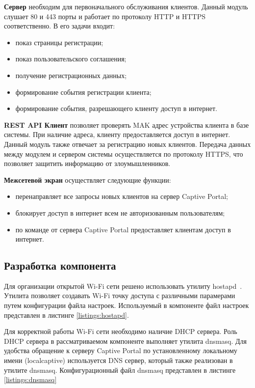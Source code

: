 \textbf{Сервер} необходим для первоначального обслуживания клиентов. Данный модуль слушает 80 и 443 порты и работает по протоколу HTTP и HTTPS соответственно. В его задачи входит:

\begin{itemize}
	\item показ страницы регистрации;
	\item показ пользовательского соглашения;
	\item получение регистрационных данных;
	\item формирование события регистрации клиента;
	\item формирование события, разрешающего клиенту доступ в интернет.
\end{itemize}

\textbf{REST API Клиент} позволяет проверять MAK адрес устройства клиента в базе системы. При наличие адреса, клиенту предоставляется доступ в интернет. Данный модуль также отвечает за регистрацию новых клиентов. Передача данных между модулем и сервером системы осуществляется по протоколу HTTPS, что позволяет защитить информацию от злоумышленников.

\textbf{Межсетевой экран} осуществляет следующие функции:
\begin{itemize}
	\item перенаправляет все запросы новых клиентов на сервер Captive Portal;
	\item блокирует доступ в интернет всем не авторизованным пользователям;
	\item по команде от сервера Captive Portal предоставляет клиентам доступ в интернет.
\end{itemize}

\subsection{Разработка компонента}

Для организации открытой Wi-Fi сети решено использовать утилиту hostapd~\cite{hostapd}. Утилита позволяет создавать Wi-Fi точку доступа с различными парамерами путем конфигурации файла настроек. Используемый в компоненте файл настроек представлен в листинге \ref{listings:hostapd}.

Для корректной работы Wi-Fi сети необходимо наличие DHCP сервера. Роль DHCP сервера в рассматриваемом компоненте выполняет утилита dnsmasq. Для удобства обращение к серверу Captive Portal по установленному локальному имени (localcaptive) используется DNS сервер, который также реализован в утилите dnsmasq. Конфигурационный файл dnsmasq представлен в листинге \ref{listings:dnsmasq}

